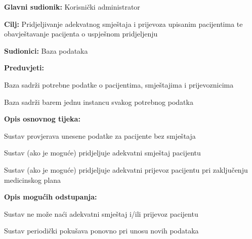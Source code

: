 					\noindent {}
					\begin{packed_item}
						\item \textbf{Glavni sudionik:} Korisnički administrator
						\item  \textbf{Cilj:} Pridjeljivanje adekvatnog smještaja i prijevoza upisanim pacijentima te obavještavanje pacijenta o uspješnom pridjeljenju
						\item  \textbf{Sudionici:} Baza podataka
						\item  \textbf{Preduvjeti:}
						\item[] \begin{packed_enum}
							\item Baza sadrži potrebne podatke o pacijentima, smještajima i prijevoznicima
							\item Baza sadrži barem jednu instancu svakog potrebnog podatka
						\end{packed_enum}
						
						\item  \textbf{Opis osnovnog tijeka:}
						\item[] \begin{packed_enum}
							\item Sustav provjerava unesene podatke za pacijente bez smještaja
							\item Sustav (ako je moguće) pridjeljuje adekvatni smještaj pacijentu
							\item Sustav (ako je moguće) pridjeljuje adekvatni prijevoz pacijentu pri zaključenju medicinskog plana
						\end{packed_enum}
						
						\item  \textbf{Opis mogućih odstupanja:}
						\item[] \begin{packed_item}
							\item[2.a] Sustav ne može naći adekvatni smještaj i/ili prijevoz pacijentu
							\item[] \begin{packed_enum}
								\item Sustav periodički pokušava ponovno pri unosu novih podataka
							\end{packed_enum}
						\end{packed_item}
					\end{packed_item}
				\break
					
